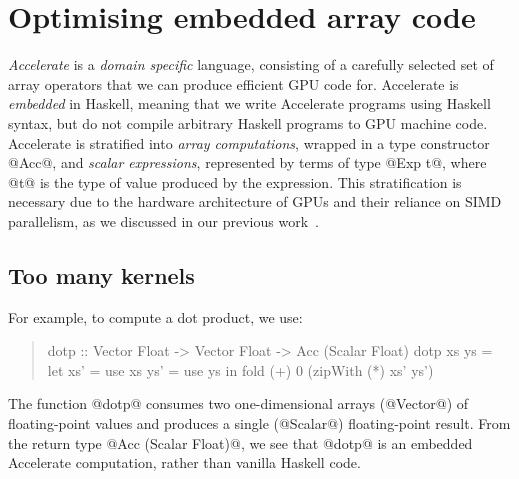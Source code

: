 \section{Optimising embedded array code} %
\label{sec:example}

\emph{Accelerate} is a \emph{domain specific} language, consisting of a carefully selected set of array operators that we can produce efficient GPU code for. Accelerate is \emph{embedded} in Haskell, meaning that we write Accelerate programs using Haskell syntax, but do not compile arbitrary Haskell programs to GPU machine code. Accelerate is stratified into \emph{array computations}, wrapped in a type constructor @Acc@, and \emph{scalar expressions}, represented by terms of type @Exp t@, where @t@ is the type of value produced by the expression. This stratification is necessary due to the hardware architecture of GPUs and their reliance on SIMD parallelism, as we discussed in our previous work~\cite{Chakravarty:Accelerate}.


\subsection{Too many kernels}
\label{code:dotp}

For example, to compute a dot product, we use:
%
\begin{quote}
\begin{code}
dotp :: Vector Float -> Vector Float 
     -> Acc (Scalar Float)
dotp xs ys = let xs' = use xs
                 ys' = use ys
             in  fold (+) 0 (zipWith (*) xs' ys')
\end{code}
\end{quote}
%
The function @dotp@ consumes two one-dimensional arrays (@Vector@) of floating-point values and produces a single (@Scalar@) floating-point result. From the return type @Acc (Scalar Float)@, we see that @dotp@ is an embedded Accelerate computation, rather than vanilla Haskell code.

